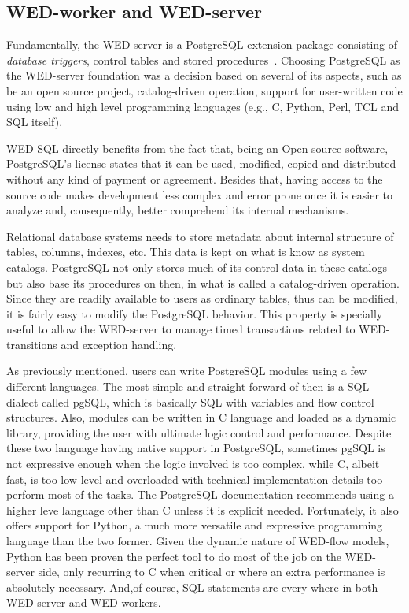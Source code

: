 \documentclass[12pt]{article}
\begin{document}
\subsection{WED-worker and WED-server}
Fundamentally, the WED-server is a PostgreSQL extension package consisting of \emph{database triggers}, control tables and 
stored procedures~\cite{NAV}. Choosing PostgreSQL as the WED-server foundation was a decision based on several of its
aspects, such as be an open source project, catalog-driven operation, support for user-written code using low and high level 
programming languages (e.g., C, Python, Perl, TCL and SQL itself).

\par  WED-SQL directly benefits from the fact that, being an Open-source software, PostgreSQL's license states that it can be used, 
modified, copied and distributed without any kind of payment or agreement. Besides that, having access to the source code
makes development less complex and error prone once it is easier to analyze and, consequently, better comprehend its internal
mechanisms. 

\par Relational database systems needs to store metadata about internal structure of tables, columns, indexes, etc. This data
is kept on what is know as system catalogs. PostgreSQL not only stores much of its control data in these catalogs
but also base its procedures on then, in what is called a catalog-driven operation. Since they are readily  
available to users as ordinary tables, thus can be modified, it is fairly easy to modify the PostgreSQL behavior. This
property is specially useful to allow the WED-server to manage timed transactions related to WED-transitions and exception 
handling. 

\par As previously mentioned, users can write PostgreSQL modules using a few different languages. The most simple and straight
forward of then is a SQL dialect called pgSQL, which is basically SQL with variables and flow control structures. Also, modules
can be written in C language and loaded as a dynamic library, providing the user with ultimate logic control and performance.
Despite these two language having native support in PostgreSQL, sometimes pgSQL is not expressive enough when the logic
involved is too complex, while C, albeit fast, is too low level and overloaded with technical implementation details too
perform most of the tasks. The PostgreSQL documentation recommends using a higher leve language other than C unless it is explicit
needed. Fortunately, it also offers support for Python, a much more versatile and expressive programming language than
the two former. Given the dynamic nature of WED-flow models, Python has been proven the perfect tool to do most of the job
on the WED-server side, only recurring to C when critical or where an extra performance is absolutely necessary. And,of
course, SQL statements are every where in both WED-server and WED-workers. 
\end{document}

